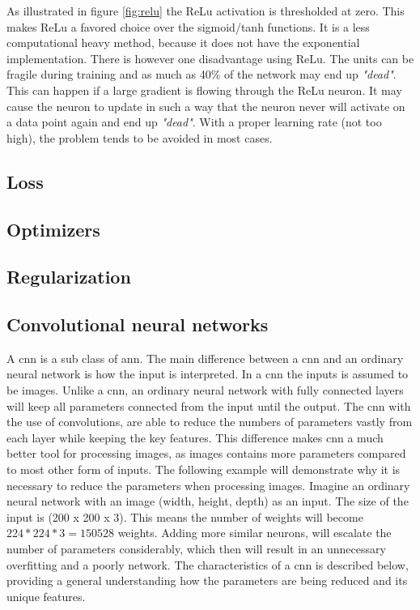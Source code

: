 \documentclass[USenglish]{ifimaster}  %
\begin{document}
As illustrated in figure \ref{fig:relu} the ReLu activation is thresholded at zero. This makes ReLu a favored choice over the sigmoid/tanh functions. It is a less computational heavy method, because it does not have the exponential implementation. There is however one disadvantage using ReLu. The units can be fragile during training and as much as 40\% of the network may end up \textit{"dead"}. This can happen if a large gradient is flowing through the ReLu neuron. It may cause the neuron to update in such a way that the neuron never will activate on a data point again and end up \textit{"dead"}. With a proper learning rate (not too high), the problem tends to be avoided in most cases.

\subsection{Loss}
\subsection{Optimizers}
\subsection{Regularization}
\subsection{Convolutional neural networks}
A \ac{cnn} is a sub class of \ac{ann}. The main difference between a \ac{cnn} and an ordinary neural network is how the input is interpreted. In a \ac{cnn} the inputs is assumed to be images. 
\newline
\newline
Unlike a \ac{cnn}, an ordinary neural network with fully connected layers will keep all parameters connected from the input until the output. The \ac{cnn} with the use of convolutions, are able to reduce the numbers of parameters vastly from each layer while keeping the key features. This difference makes \ac{cnn} a much better tool for processing images, as images contains more parameters compared to most other form of inputs. 
\newline
\newline
The following example will demonstrate why it is necessary to reduce the parameters when processing images. Imagine an ordinary neural network with an image (width, height, depth) as an input. The size of the input is (200 x 200 x 3). This means the number of weights will become $224 * 224 * 3 = 150528$ weights. Adding more similar neurons, will escalate the number of parameters considerably, which then will result in an unnecessary overfitting and a poorly network.
\newline
\newline
The characteristics of a \ac{cnn} is described below, providing a general understanding how the parameters are being reduced and its unique features.
\end{document}
